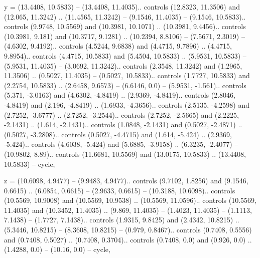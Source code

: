 y = {(13.4408, 10.5833) -- (13.4408, 11.4035).. controls (12.8323, 11.3506) and (12.065, 11.3242) .. (11.4565, 11.3242) -- (9.1546, 11.4035) -- (9.1546, 10.5833).. controls (9.9748, 10.5569) and (10.3981, 10.1071) .. (10.3981, 9.4456).. controls (10.3981, 9.181) and (10.3717, 9.1281) .. (10.2394, 8.8106) -- (7.5671, 2.3019) -- (4.6302, 9.4192).. controls (4.5244, 9.6838) and (4.4715, 9.7896) .. (4.4715, 9.8954).. controls (4.4715, 10.5833) and (5.4504, 10.5833) .. (5.9531, 10.5833) -- (5.9531, 11.4035) -- (3.0692, 11.3242).. controls (2.3548, 11.3242) and (1.2965, 11.3506) .. (0.5027, 11.4035) -- (0.5027, 10.5833).. controls (1.7727, 10.5833) and (2.2754, 10.5833) .. (2.6458, 9.6573) -- (6.6146, 0.0) -- (5.9531, -1.561).. controls (5.371, -3.0163) and (4.6302, -4.8419) .. (2.9369, -4.8419).. controls (2.8046, -4.8419) and (2.196, -4.8419) .. (1.6933, -4.3656).. controls (2.5135, -4.2598) and (2.7252, -3.6777) .. (2.7252, -3.2544).. controls (2.7252, -2.5665) and (2.2225, -2.1431) .. (1.614, -2.1431).. controls (1.0848, -2.1431) and (0.5027, -2.4871) .. (0.5027, -3.2808).. controls (0.5027, -4.4715) and (1.614, -5.424) .. (2.9369, -5.424).. controls (4.6038, -5.424) and (5.6885, -3.9158) .. (6.3235, -2.4077) -- (10.9802, 8.89).. controls (11.6681, 10.5569) and (13.0175, 10.5833) .. (13.4408, 10.5833) -- cycle},

z = {(10.6098, 4.9477) -- (9.9483, 4.9477).. controls (9.7102, 1.8256) and (9.1546, 0.6615) .. (6.0854, 0.6615) -- (2.9633, 0.6615) -- (10.3188, 10.6098).. controls (10.5569, 10.9008) and (10.5569, 10.9538) .. (10.5569, 11.0596).. controls (10.5569, 11.4035) and (10.3452, 11.4035) .. (9.869, 11.4035) -- (1.4023, 11.4035) -- (1.1113, 7.1438) -- (1.7727, 7.1438).. controls (1.9315, 9.8425) and (2.4342, 10.8215) .. (5.3446, 10.8215) -- (8.3608, 10.8215) -- (0.979, 0.8467).. controls (0.7408, 0.5556) and (0.7408, 0.5027) .. (0.7408, 0.3704).. controls (0.7408, 0.0) and (0.926, 0.0) .. (1.4288, 0.0) -- (10.16, 0.0) -- cycle},